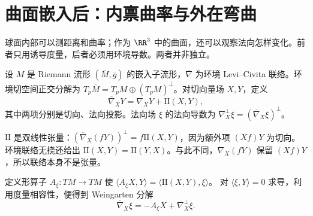 \section{曲面嵌入后：内禀曲率与外在弯曲}

球面内部可以测距离和曲率；作为 \(\RR^3\) 中的曲面，还可以观察法向怎样变化。前者只用诱导度量，后者必须用环境导数。两者并非独立。

\begin{definition}[第二基本形式与法向联络]
设 \(M\) 是 Riemann 流形 \((\overline M,\overline g)\) 的嵌入子流形，\(\overline\nabla\) 为环境 Levi--Civita 联络。环境切空间正交分解为 \(T_p\overline M=T_pM\oplus(T_pM)^\perp\)。对切向量场 \(X,Y\)，定义
\[
\overline\nabla_XY=\nabla_XY+\mathrm{II}(X,Y),
\]
其中两项分别是切向、法向投影。法向场 \(\xi\) 的法向导数为
\(\nabla_X^\perp\xi=(\overline\nabla_X\xi)^\perp\)。
\end{definition}

\(\mathrm{II}\) 是双线性张量：\((\overline\nabla_X(fY))^\perp=f\mathrm{II}(X,Y)\)，因为额外项 \((Xf)Y\) 为切向。环境联络无挠还给出 \(\mathrm{II}(X,Y)=\mathrm{II}(Y,X)\)。与此不同，\(\nabla_X(fY)\) 保留 \((Xf)Y\)，所以联络本身不是张量。

定义形算子 \(A_\xi:TM\to TM\) 使
\(\langle A_\xi X,Y\rangle=\langle\mathrm{II}(X,Y),\xi\rangle\)。
对 \(\langle\xi,Y\rangle=0\) 求导，利用度量相容性，便得到 Weingarten 分解
\[
\overline\nabla_X\xi=-A_\xi X+\nabla_X^\perp\xi.
\]

